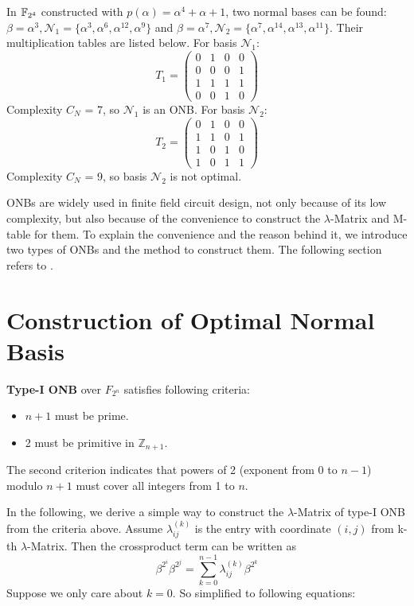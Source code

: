 \begin{Example}
\label{ex:app4}
In ${\mathbb{F}}_{2^4}$ constructed with $p(\alpha) = \alpha^4 + \alpha + 1$, two normal bases can be found:
$\beta = \alpha^3, \mathcal N_1 = \{ \alpha^3, \alpha^6, \alpha^{12}, \alpha^9\}$ and 
$\beta = \alpha^7, \mathcal N_2 = \{\alpha^7, \alpha^{14}, \alpha^{13}, \alpha^{11}\}$. 
Their multiplication tables are listed below. For basis $\mathcal N_1$:
\begin{equation}
T_1 = \left(
\begin{array}{lccr}
0 & 1 & 0 & 0\\
0 & 0 & 0 & 1\\
1 & 1 & 1 & 1\\
0 & 0 & 1 & 0
\end{array} \right)
\end{equation}
Complexity $C_N$ = 7, so $\mathcal N_1$ is an ONB. For basis $\mathcal N_2$:
\begin{equation}
T_2 = \left(
\begin{array}{lccr}
0 & 1 & 0 & 0\\
1 & 1 & 0 & 1\\
1 & 0 & 1 & 0\\
1 & 0 & 1 & 1
\end{array} \right)
\end{equation}
Complexity $C_N$ = 9, so basis $\mathcal N_2$ is not optimal.
\end{Example}

ONBs are widely used in finite field circuit design, not only because of its low complexity, 
but also because of the convenience to construct the $\lambda$-Matrix and M-table for them. 
To explain the convenience and the reason behind it, we introduce two types of ONBs and the method 
to construct them.
The following section refers to \cite{rosingbook}.
\section{Construction of Optimal Normal Basis}
{\bf Type-I ONB} over $F_{2^n}$ satisfies following criteria:
\begin{itemize}
\item $n+1$ must be prime.
\item 2 must be primitive in $\mathbb{Z}_{n+1}$.
\end{itemize}
The second criterion indicates that powers of 2 (exponent from 0 to $n-1$) modulo $n+1$ must cover all integers
from 1 to $n$.

In the following, we derive a simple way to construct the $\lambda$-Matrix of type-I ONB 
from the criteria above. 
Assume $\lambda_{ij}^{(k)}$ is the entry with coordinate $(i,j)$ from k-th $\lambda$-Matrix. Then the crossproduct
term can be written as
\begin{equation}
\beta^{2^i}\beta^{2^j} = \sum_{k=0}^{n-1} \lambda_{ij}^{(k)} \beta^{2^k}
\end{equation}
Suppose we only care about $k=0$. So simplified to following equations:

